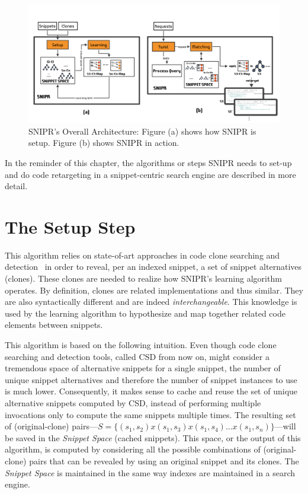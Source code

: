 \begin{figure}[!ht]
    \centering
    \includegraphics[width=\textwidth]{images/SnippetRetargetingApproach}
    \caption{SNIPR's Overall Architecture: Figure (a) shows how SNIPR is setup. Figure (b) shows SNIPR in action.}
    \label{fig:sniprentire}
\end{figure}


In the reminder of this chapter, the algorithms or steps \uppercase{SnipR} needs to set-up and do code retargeting in a snippet-centric search engine are described in more detail. 

\section{The Setup Step}
\label{sec:precomputation}

This algorithm relies on state-of-art approaches in code clone searching and detection~\cite{Jiang:2007cj, Roh:2010ts} in order to reveal, per an indexed snippet, a set of snippet alternatives (clones). These clones are needed to realize how \uppercase{SnipR}'s learning algorithm operates. By definition, clones are related implementations and thus similar. They are also syntactically different and are indeed \emph{interchangeable}. This knowledge is used by the learning algorithm to hypothesize and map together related code elements between snippets. 

This algorithm is based on the following intuition. Even though code clone searching and detection tools, called CSD from now on, might consider a tremendous space of alternative snippets for a single snippet, the number of unique snippet alternatives and therefore the number of snippet instances to use is much lower. Consequently, it makes sense to cache and reuse the set of unique alternative snippets computed by CSD, instead of performing multiple invocations only to compute the same snippets multiple times. The resulting set of (original-clone) pairs---$S = \{(s_1, s_2) x (s_1, s_3) x (s_1, s_4) ... x (s_1, s_n)\}$---will be saved in the \emph{Snippet Space} (cached snippets). This space, or the output of this algorithm, is computed by considering all the possible combinations of (original-clone) pairs that can be revealed by using an original snippet and its clones. The \emph{Snippet Space} is maintained in the same way indexes are maintained in a search engine.

